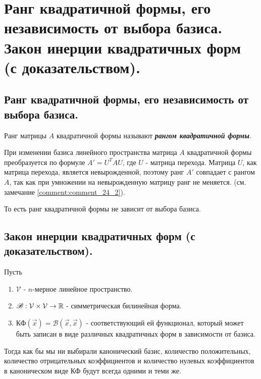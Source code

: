 \section{
    Ранг квадратичной формы, его независимость от выбора базиса. Закон инерции квадратичных форм (с доказательством). 
}

\subsection{
    Ранг квадратичной формы, его независимость от выбора базиса.
}

\begin{definition}
    Ранг матрицы $A$ квадратичной формы называют \textbf{\textit{рангом квадратичной формы}}.
\end{definition}

При изменении базиса линейного пространства матрица $A$ квадратичной формы преобразуется по формуле $A' = U^TAU$, где $U$ - матрица перехода. Матрица $U$, как матрица перехода, является невырожденной, поэтому ранг $A'$ совпадает с рангом $A$, так как при умножении на невырожденную матрицу ранг не меняется. (см. замечание \ref{comment:comment_24_2}). 

То есть ранг квадратичной формы не зависит от выбора базиса.

\newpage


\subsection{
    Закон инерции квадратичных форм (с доказательством).
}

\begin{theorem} Пусть
    \begin{enumerate}
        \item $\mathcal{V}$ - $n$-мерное линейное пространство.
        \item $\mathscr{B}: \mathcal{V} \times \mathcal{V} \to \mathbb{R}$ - симметрическая билинейная форма.
        \item $\text{КФ}(\vec{x}) = \mathscr{B}(\vec{x}, \vec{x})$ - соответствующий ей функционал, который может быть записан в виде различных квадратичных форм в зависимости от базиса.
    \end{enumerate}

    Тогда как бы мы ни выбирали канонический базис, количество положительных, количество отрицательных коэффициентов и количество нулевых коэффициентов в каноническом виде КФ будут всегда одними и теми же.
\end{theorem}

